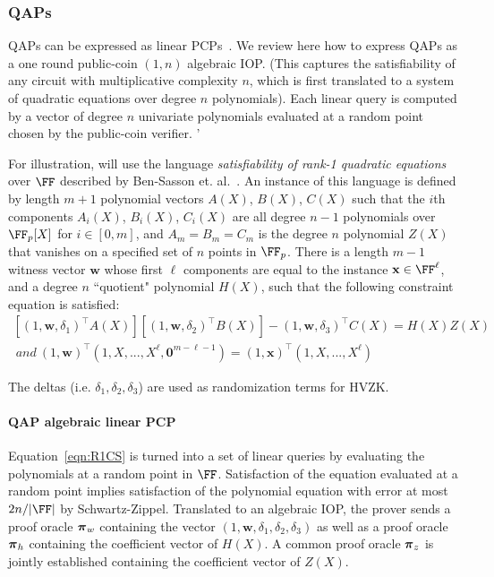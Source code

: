\subsubsection{QAPs} 

QAPs can be expressed as linear PCPs~\cite{TCC:BCIOP13,C:BCGTV13}. We review here how to express QAPs as a one round public-coin $(1, n)$ algebraic IOP. (This captures the satisfiability of any circuit with multiplicative complexity $n$, which is first translated to a system of quadratic equations over degree $n$ polynomials). Each linear query is computed by a vector of degree $n$ univariate polynomials evaluated at a random point chosen by the public-coin verifier. '

For illustration, will use the language \emph{satisfiability of rank-1 quadratic equations} over $\FF$ described by Ben-Sasson et. al.~\cite{C:BCGTV13}. An instance of this language is defined by length $m+1$ polynomial vectors $A(X)$, $B(X)$, $C(X)$ such that the $i$th components $A_i(X)$, $B_i(X)$, $C_i(X)$ are all degree $n-1$ polynomials over $\FF_p[X]$ for $i \in [0,m]$, and $A_m = B_m = C_m$ is the degree $n$ polynomial $Z(X)$ that vanishes on a specified set of $n$ points in $\FF_p$. There is a length $m-1$ witness vector $\mathbf{w}$ whose first $\ell$ components are equal to the instance $\mathbf{x} \in \FF^\ell$, and a degree $n$ ``quotient" polynomial $H(X)$, such that the following constraint equation is satisfied: 
\begin{equation} \label{eqn:R1CS} 
\begin{split}
[(1, \mathbf{w}, \delta_1)^\top A(X)][(1, \mathbf{w}, \delta_2)^\top B(X)] 
- (1, \mathbf{w}, \delta_3)^\top C(X) = H(X)Z(X) \\ 
\ and \ (1,\mathbf{w})^\top (1,X,...,X^{\ell}, \mathbf{0}^{m- \ell -1}) = (1,\mathbf{x})^\top (1, X,...,X^{\ell})
\end{split} 
\end{equation} 

The deltas (i.e. $\delta_1, \delta_2, \delta_3$) are used as randomization terms for HVZK. 

\paragraph{QAP algebraic linear PCP} Equation~\ref{eqn:R1CS} is turned into a set of linear queries by evaluating the polynomials at a random point in $\FF$. Satisfaction of the equation evaluated at a random point implies satisfaction of the polynomial equation with error at most $2n / |\FF|$ by Schwartz-Zippel. Translated to an algebraic IOP, the prover sends a proof oracle $\boldsymbol{\pi}_w$ containing the vector $(1, \mathbf{w}, \delta_1, \delta_2, \delta_3)$ as well as a proof oracle $\boldsymbol{\pi}_h$ containing the coefficient vector of $H(X)$. A common proof oracle $\boldsymbol{\pi}_z$ is jointly established containing the coefficient vector of $Z(X)$. 


